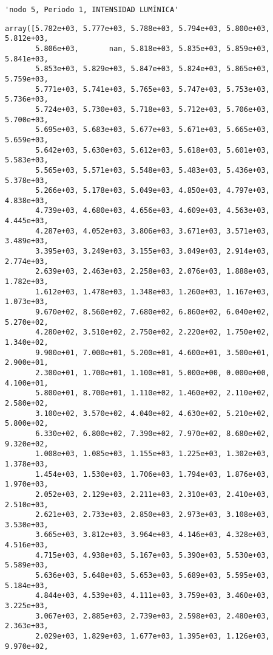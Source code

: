 \documentclass[11pt]{article}
\begin{document}
    
    
    \begin{verbatim}
'nodo 5, Periodo 1, INTENSIDAD LUMÍNICA'
    \end{verbatim}

    
    
    \begin{verbatim}
array([5.782e+03, 5.777e+03, 5.788e+03, 5.794e+03, 5.800e+03, 5.812e+03,
       5.806e+03,       nan, 5.818e+03, 5.835e+03, 5.859e+03, 5.841e+03,
       5.853e+03, 5.829e+03, 5.847e+03, 5.824e+03, 5.865e+03, 5.759e+03,
       5.771e+03, 5.741e+03, 5.765e+03, 5.747e+03, 5.753e+03, 5.736e+03,
       5.724e+03, 5.730e+03, 5.718e+03, 5.712e+03, 5.706e+03, 5.700e+03,
       5.695e+03, 5.683e+03, 5.677e+03, 5.671e+03, 5.665e+03, 5.659e+03,
       5.642e+03, 5.630e+03, 5.612e+03, 5.618e+03, 5.601e+03, 5.583e+03,
       5.565e+03, 5.571e+03, 5.548e+03, 5.483e+03, 5.436e+03, 5.378e+03,
       5.266e+03, 5.178e+03, 5.049e+03, 4.850e+03, 4.797e+03, 4.838e+03,
       4.739e+03, 4.680e+03, 4.656e+03, 4.609e+03, 4.563e+03, 4.445e+03,
       4.287e+03, 4.052e+03, 3.806e+03, 3.671e+03, 3.571e+03, 3.489e+03,
       3.395e+03, 3.249e+03, 3.155e+03, 3.049e+03, 2.914e+03, 2.774e+03,
       2.639e+03, 2.463e+03, 2.258e+03, 2.076e+03, 1.888e+03, 1.782e+03,
       1.612e+03, 1.478e+03, 1.348e+03, 1.260e+03, 1.167e+03, 1.073e+03,
       9.670e+02, 8.560e+02, 7.680e+02, 6.860e+02, 6.040e+02, 5.270e+02,
       4.280e+02, 3.510e+02, 2.750e+02, 2.220e+02, 1.750e+02, 1.340e+02,
       9.900e+01, 7.000e+01, 5.200e+01, 4.600e+01, 3.500e+01, 2.900e+01,
       2.300e+01, 1.700e+01, 1.100e+01, 5.000e+00, 0.000e+00, 4.100e+01,
       5.800e+01, 8.700e+01, 1.110e+02, 1.460e+02, 2.110e+02, 2.580e+02,
       3.100e+02, 3.570e+02, 4.040e+02, 4.630e+02, 5.210e+02, 5.800e+02,
       6.330e+02, 6.800e+02, 7.390e+02, 7.970e+02, 8.680e+02, 9.320e+02,
       1.008e+03, 1.085e+03, 1.155e+03, 1.225e+03, 1.302e+03, 1.378e+03,
       1.454e+03, 1.530e+03, 1.706e+03, 1.794e+03, 1.876e+03, 1.970e+03,
       2.052e+03, 2.129e+03, 2.211e+03, 2.310e+03, 2.410e+03, 2.510e+03,
       2.621e+03, 2.733e+03, 2.850e+03, 2.973e+03, 3.108e+03, 3.530e+03,
       3.665e+03, 3.812e+03, 3.964e+03, 4.146e+03, 4.328e+03, 4.516e+03,
       4.715e+03, 4.938e+03, 5.167e+03, 5.390e+03, 5.530e+03, 5.589e+03,
       5.636e+03, 5.648e+03, 5.653e+03, 5.689e+03, 5.595e+03, 5.184e+03,
       4.844e+03, 4.539e+03, 4.111e+03, 3.759e+03, 3.460e+03, 3.225e+03,
       3.067e+03, 2.885e+03, 2.739e+03, 2.598e+03, 2.480e+03, 2.363e+03,
       2.029e+03, 1.829e+03, 1.677e+03, 1.395e+03, 1.126e+03, 9.970e+02,

\end{verbatim}
\end{document}
